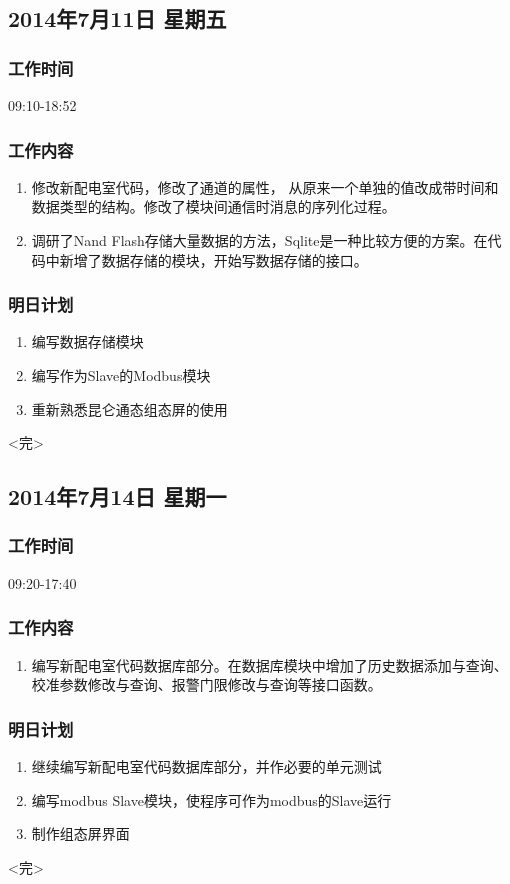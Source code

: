 \documentclass[11pt]{article}
\begin{document}
\newpage
\subsection{2014年7月11日 星期五}

\subsubsection{工作时间}

  09:10-18:52
\subsubsection{工作内容}
  \begin{enumerate}
  \item 修改新配电室代码，修改了通道的属性，
    从原来一个单独的值改成带时间和数据类型的结构。修改了模块间通信时消息的序列化过程。
  \item 调研了Nand Flash存储大量数据的方法，Sqlite是一种比较方便的方案。在代码中新增了数据存储的模块，开始写数据存储的接口。
  \end{enumerate}

\subsubsection{明日计划}
  \begin{enumerate}
  \item 编写数据存储模块
  \item 编写作为Slave的Modbus模块
  \item 重新熟悉昆仑通态组态屏的使用
  \end{enumerate}

\centerline{<完>}


\newpage
\subsection{2014年7月14日 星期一}
\subsubsection{工作时间}
09:20-17:40
\subsubsection{工作内容}
\begin{enumerate}
  \item 编写新配电室代码数据库部分。在数据库模块中增加了历史数据添加与查询、校准参数修改与查询、报警门限修改与查询等接口函数。
\end{enumerate}

\subsubsection{明日计划}
\begin{enumerate}
  \item 继续编写新配电室代码数据库部分，并作必要的单元测试
  \item 编写modbus Slave模块，使程序可作为modbus的Slave运行
  \item 制作组态屏界面
\end{enumerate}

\centerline{<完>}
\end{document}
